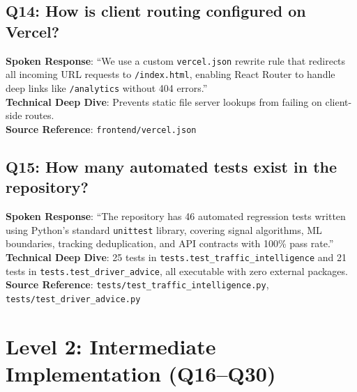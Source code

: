 \documentclass[11pt,a4paper,oneside]{report}
\begin{document}
\subsection*{Q14: How is client routing configured on Vercel?}
\begin{interviewbox}
\textbf{Spoken Response}: ``We use a custom \texttt{vercel.json} rewrite rule that redirects all incoming URL requests to \texttt{/index.html}, enabling React Router to handle deep links like \texttt{/analytics} without 404 errors.''\\
\textbf{Technical Deep Dive}: Prevents static file server lookups from failing on client-side routes.\\
\textbf{Source Reference}: \texttt{frontend/vercel.json}
\end{interviewbox}

\subsection*{Q15: How many automated tests exist in the repository?}
\begin{interviewbox}
\textbf{Spoken Response}: ``The repository has 46 automated regression tests written using Python's standard \texttt{unittest} library, covering signal algorithms, ML boundaries, tracking deduplication, and API contracts with 100\% pass rate.''\\
\textbf{Technical Deep Dive}: 25 tests in \texttt{tests.test\_traffic\_intelligence} and 21 tests in \texttt{tests.test\_driver\_advice}, all executable with zero external packages.\\
\textbf{Source Reference}: \texttt{tests/test\_traffic\_intelligence.py}, \texttt{tests/test\_driver\_advice.py}
\end{interviewbox}

\section{Level 2: Intermediate Implementation (Q16--Q30)}
\end{document}
